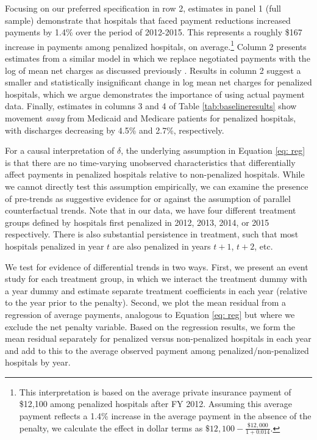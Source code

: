 \documentclass[12pt]{article}
\begin{document}
Focusing on our preferred specification in row 2, estimates in panel 1 (full sample) demonstrate that hospitals that faced payment reductions increased payments by 1.4\% over the period of 2012-2015.  This represents a roughly \$167 increase in payments among penalized hospitals, on average.\footnote{This interpretation is based on the average private insurance payment of \$12,100 among penalized hospitals after FY 2012. Assuming this average payment reflects a 1.4\% increase in the average payment in the absence of the penalty, we calculate the effect in dollar terms as $\$12,100 - \frac{\$12,000}{1+0.014}$.} Column 2 presents estimates from a similar model in which we replace negotiated payments with the log of mean net charges as discussed previously \citep{dafny2009,lewis2015,schmitt2017,dranove2017}. Results in column 2 suggest a smaller and statistically insignificant change in log mean net charges for penalized hospitals, which we argue demonstrates the importance of using actual payment data. Finally, estimates in columns 3 and 4 of Table \ref{tab:baselineresults} show movement \textit{away} from Medicaid and Medicare patients for penalized hospitals, with discharges decreasing by 4.5\% and 2.7\%, respectively.

For a causal interpretation of $\delta$, the underlying assumption in Equation \ref{eq: reg} is that there are no time-varying unobserved characteristics that differentially affect payments in penalized hospitals relative to non-penalized hospitals. While we cannot directly test this assumption empirically, we can examine the presence of pre-trends as suggestive evidence for or against the assumption of parallel counterfactual trends. Note that in our data, we have four different treatment groups defined by hospitals first penalized in 2012, 2013, 2014, or 2015 respectively. There is also substantial persistence in treatment, such that most hospitals penalized in year $t$ are also penalized in years $t+1$, $t+2$, etc. 

We test for evidence of differential trends in two ways. First, we present an event study for each treatment group, in which we interact the treatment dummy with a year dummy and estimate separate treatment coefficients in each year (relative to the year prior to the penalty). Second, we plot the mean residual from a regression of average payments, analogous to Equation \ref{eq: reg} but where we exclude the net penalty variable. Based on the regression results, we form the mean residual separately for penalized versus non-penalized hospitals in each year and add to this to the average observed payment among penalized/non-penalized hospitals by year. 
\end{document}

